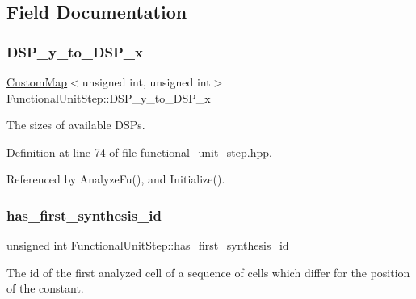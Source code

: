 \subsection{Field Documentation}
\mbox{\label{classFunctionalUnitStep_a56a8b3273efc8b8aa42f6bb6b7d86619}} 
\subsubsection{\texorpdfstring{D\+S\+P\+\_\+y\+\_\+to\+\_\+\+D\+S\+P\+\_\+x}{DSP\_y\_to\_DSP\_x}}
{\footnotesize\ttfamily \hyperlink{custom__map_8hpp_a18ca01763abbe3e5623223bfe5aaac6b}{Custom\+Map}$<$unsigned int, unsigned int$>$ Functional\+Unit\+Step\+::\+D\+S\+P\+\_\+y\+\_\+to\+\_\+\+D\+S\+P\+\_\+x\hspace{0.3cm}{\ttfamily [protected]}}



The sizes of available D\+S\+Ps. 



Definition at line 74 of file functional\+\_\+unit\+\_\+step.\+hpp.



Referenced by Analyze\+Fu(), and Initialize().

\mbox{\label{classFunctionalUnitStep_a50f97ea76cd8c763ae8c42472ea40287}} 
\subsubsection{\texorpdfstring{has\+\_\+first\+\_\+synthesis\+\_\+id}{has\_first\_synthesis\_id}}
{\footnotesize\ttfamily unsigned int Functional\+Unit\+Step\+::has\+\_\+first\+\_\+synthesis\+\_\+id\hspace{0.3cm}{\ttfamily [protected]}}



The id of the first analyzed cell of a sequence of cells which differ for the position of the constant. 



